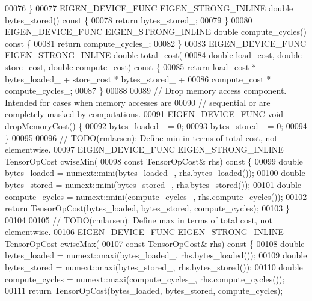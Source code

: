 \begin{DoxyCode}
00076   \}
00077   EIGEN\_DEVICE\_FUNC EIGEN\_STRONG\_INLINE \textcolor{keywordtype}{double} bytes\_stored()\textcolor{keyword}{ const }\{
00078     \textcolor{keywordflow}{return} bytes\_stored\_;
00079   \}
00080   EIGEN\_DEVICE\_FUNC EIGEN\_STRONG\_INLINE \textcolor{keywordtype}{double} compute\_cycles()\textcolor{keyword}{ const }\{
00081     \textcolor{keywordflow}{return} compute\_cycles\_;
00082   \}
00083   EIGEN\_DEVICE\_FUNC EIGEN\_STRONG\_INLINE \textcolor{keywordtype}{double} total\_cost(
00084       \textcolor{keywordtype}{double} load\_cost, \textcolor{keywordtype}{double} store\_cost, \textcolor{keywordtype}{double} compute\_cost)\textcolor{keyword}{ const }\{
00085     \textcolor{keywordflow}{return} load\_cost * bytes\_loaded\_ + store\_cost * bytes\_stored\_ +
00086            compute\_cost * compute\_cycles\_;
00087   \}
00088 
00089   \textcolor{comment}{// Drop memory access component. Intended for cases when memory accesses are}
00090   \textcolor{comment}{// sequential or are completely masked by computations.}
00091   EIGEN\_DEVICE\_FUNC \textcolor{keywordtype}{void} dropMemoryCost() \{
00092     bytes\_loaded\_ = 0;
00093     bytes\_stored\_ = 0;
00094   \}
00095 
00096   \textcolor{comment}{// TODO(rmlarsen): Define min in terms of total cost, not elementwise.}
00097   EIGEN\_DEVICE\_FUNC EIGEN\_STRONG\_INLINE TensorOpCost cwiseMin(
00098       \textcolor{keyword}{const} TensorOpCost& rhs)\textcolor{keyword}{ const }\{
00099     \textcolor{keywordtype}{double} bytes\_loaded = numext::mini(bytes\_loaded\_, rhs.bytes\_loaded());
00100     \textcolor{keywordtype}{double} bytes\_stored = numext::mini(bytes\_stored\_, rhs.bytes\_stored());
00101     \textcolor{keywordtype}{double} compute\_cycles = numext::mini(compute\_cycles\_, rhs.compute\_cycles());
00102     \textcolor{keywordflow}{return} TensorOpCost(bytes\_loaded, bytes\_stored, compute\_cycles);
00103   \}
00104 
00105   \textcolor{comment}{// TODO(rmlarsen): Define max in terms of total cost, not elementwise.}
00106   EIGEN\_DEVICE\_FUNC EIGEN\_STRONG\_INLINE TensorOpCost cwiseMax(
00107       \textcolor{keyword}{const} TensorOpCost& rhs)\textcolor{keyword}{ const }\{
00108     \textcolor{keywordtype}{double} bytes\_loaded = numext::maxi(bytes\_loaded\_, rhs.bytes\_loaded());
00109     \textcolor{keywordtype}{double} bytes\_stored = numext::maxi(bytes\_stored\_, rhs.bytes\_stored());
00110     \textcolor{keywordtype}{double} compute\_cycles = numext::maxi(compute\_cycles\_, rhs.compute\_cycles());
00111     \textcolor{keywordflow}{return} TensorOpCost(bytes\_loaded, bytes\_stored, compute\_cycles);

\end{DoxyCode}

